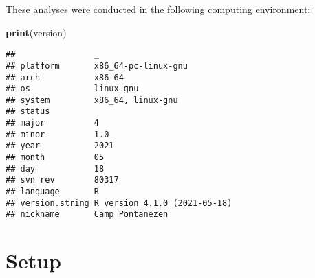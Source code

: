 \documentclass[]{book}
\newenvironment{Shaded}{\begin{snugshade}}{\end{snugshade}}
\newcommand{\KeywordTok}[1]{\textcolor[rgb]{0.13,0.29,0.53}{\textbf{#1}}}
\newcommand{\NormalTok}[1]{#1}
\begin{document}
These analyses were conducted in the following computing environment:

\begin{Shaded}
\begin{Highlighting}[]
\KeywordTok{print}\NormalTok{(version)}
\end{Highlighting}
\end{Shaded}

\begin{verbatim}
##                _                           
## platform       x86_64-pc-linux-gnu         
## arch           x86_64                      
## os             linux-gnu                   
## system         x86_64, linux-gnu           
## status                                     
## major          4                           
## minor          1.0                         
## year           2021                        
## month          05                          
## day            18                          
## svn rev        80317                       
## language       R                           
## version.string R version 4.1.0 (2021-05-18)
## nickname       Camp Pontanezen
\end{verbatim}

\hypertarget{setup-9}{%
\section{Setup}\label{setup-9}}
\end{document}
